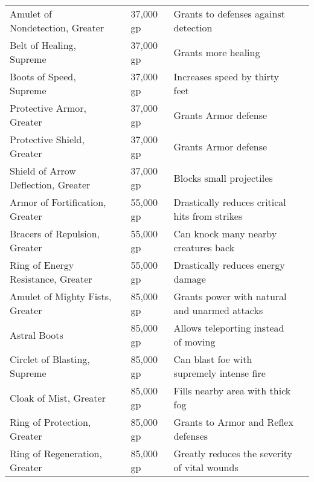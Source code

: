 \begin{longtabuwrapper}
\begin{longtabu}{l l l X l}
Amulet of Nondetection, Greater &  & 37,000 gp & Grants  to defenses against detection & \pageref{item:Amulet of Nondetection, Greater} \\
Belt of Healing, Supreme &  & 37,000 gp & Grants more healing & \pageref{item:Belt of Healing, Supreme} \\
Boots of Speed, Supreme &  & 37,000 gp & Increases speed by thirty feet & \pageref{item:Boots of Speed, Supreme} \\
Protective Armor, Greater &  & 37,000 gp & Grants  Armor defense & \pageref{item:Protective Armor, Greater} \\
Protective Shield, Greater &  & 37,000 gp & Grants  Armor defense & \pageref{item:Protective Shield, Greater} \\
Shield of Arrow Deflection, Greater &  & 37,000 gp & Blocks small projectiles & \pageref{item:Shield of Arrow Deflection, Greater} \\
Armor of Fortification, Greater &  & 55,000 gp & Drastically reduces critical hits from strikes & \pageref{item:Armor of Fortification, Greater} \\
Bracers of Repulsion, Greater &  & 55,000 gp & Can knock many nearby creatures back & \pageref{item:Bracers of Repulsion, Greater} \\
Ring of Energy Resistance, Greater &  & 55,000 gp & Drastically reduces energy damage & \pageref{item:Ring of Energy Resistance, Greater} \\
Amulet of Mighty Fists, Greater &  & 85,000 gp & Grants  power with natural and unarmed attacks & \pageref{item:Amulet of Mighty Fists, Greater} \\
Astral Boots &  & 85,000 gp & Allows teleporting instead of moving & \pageref{item:Astral Boots} \\
Circlet of Blasting, Supreme &  & 85,000 gp & Can blast foe with supremely intense fire & \pageref{item:Circlet of Blasting, Supreme} \\
Cloak of Mist, Greater &  & 85,000 gp & Fills nearby area with thick fog & \pageref{item:Cloak of Mist, Greater} \\
Ring of Protection, Greater &  & 85,000 gp & Grants  to Armor and Reflex defenses & \pageref{item:Ring of Protection, Greater} \\
Ring of Regeneration, Greater &  & 85,000 gp & Greatly reduces the severity of vital wounds & \pageref{item:Ring of Regeneration, Greater} \\

\end{longtabu}
\end{longtabuwrapper}
